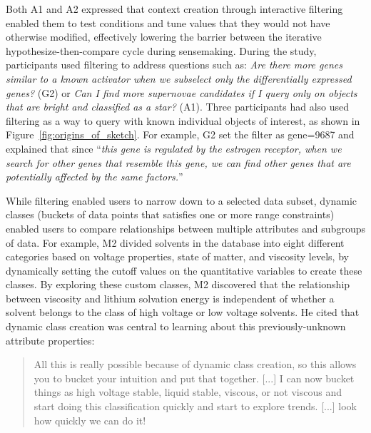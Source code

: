  \par Both A1 and A2 expressed that context creation through interactive filtering enabled them to test conditions and tune values that they would not have otherwise modified, effectively lowering the barrier between the iterative hypothesize-then-compare cycle during sensemaking.
 During the study, participants used filtering
 to address questions such as:
 \textit{Are there more genes similar
 to a known activator when we subselect
 only the differentially expressed genes?} (G2) or \textit{Can I find more supernovae candidates if I query only on objects that are bright and classified as a star?} (A1). Three participants had also used filtering as a way to query with known individual objects of interest, as shown in Figure~\ref{fig:origins_of_sketch}. For example, G2 set the filter as gene=9687 and explained that since ``\textit{this gene is regulated by the estrogen receptor, when we search for other genes that resemble this gene, we can find other genes that are potentially affected by the same factors.}''
 \par While filtering enabled users to
 narrow down to a selected data subset,
 dynamic classes (buckets of data points that satisfies one or more range constraints) enabled users to compare
 relationships between multiple attributes and subgroups of data.
 For example, M2 divided solvents in the database
 into eight different categories based on voltage properties,
 state of matter, and viscosity levels,
 by dynamically setting the cutoff values
 on the quantitative variables to create these classes.
 By exploring these custom classes, M2 discovered that the relationship between viscosity and lithium solvation energy is independent of whether a solvent belongs to the class of high voltage or low voltage solvents. He cited that dynamic class creation was central to learning about this previously-unknown attribute properties:
 \begin{quote}
 All this is really possible because of dynamic class creation, so this allows you to bucket your intuition and put that together. [...] I can now bucket things as high voltage stable, liquid stable, viscous, or not viscous and start doing this classification quickly and start to explore trends. [...] look how quickly we can do it!%
 \end{quote}
